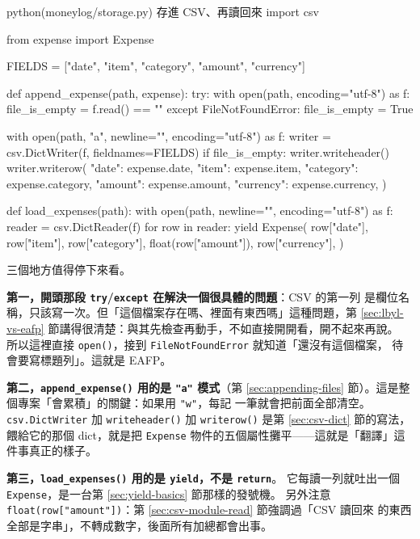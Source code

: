\begin{example}{python}{(moneylog/storage.py) 存進 CSV、再讀回來}
import csv

from expense import Expense

FIELDS = ["date", "item", "category", "amount", "currency"]


def append_expense(path, expense):
    try:
        with open(path, encoding="utf-8") as f:
            file_is_empty = f.read() == ""
    except FileNotFoundError:
        file_is_empty = True

    with open(path, "a", newline="", encoding="utf-8") as f:
        writer = csv.DictWriter(f, fieldnames=FIELDS)
        if file_is_empty:
            writer.writeheader()
        writer.writerow({
            "date": expense.date,
            "item": expense.item,
            "category": expense.category,
            "amount": expense.amount,
            "currency": expense.currency,
        })


def load_expenses(path):
    with open(path, newline="", encoding="utf-8") as f:
        reader = csv.DictReader(f)
        for row in reader:
            yield Expense(
                row["date"],
                row["item"],
                row["category"],
                float(row["amount"]),
                row["currency"],
            )
\end{example}

三個地方值得停下來看。

\textbf{第一，開頭那段 \texttt{try}/\texttt{except} 在解決一個很具體的問題}：CSV 的第一列
是欄位名稱，只該寫一次。但「這個檔案存在嗎、裡面有東西嗎」這種問題，第
\ref{sec:lbyl-vs-eafp} 節講得很清楚：與其先檢查再動手，不如直接開開看，開不起來再說。
所以這裡直接 \texttt{open()}，接到 \texttt{FileNotFoundError} 就知道「還沒有這個檔案，
待會要寫標題列」。這就是 EAFP。

\textbf{第二，\texttt{append\_expense()} 用的是 \texttt{"a"} 模式}（第
\ref{sec:appending-files} 節）。這是整個專案「會累積」的關鍵：如果用 \texttt{"w"}，每記
一筆就會把前面全部清空。\texttt{csv.DictWriter} 加 \texttt{writeheader()} 加
\texttt{writerow()} 是第 \ref{sec:csv-dict} 節的寫法，餵給它的那個 dict，就是把
\texttt{Expense} 物件的五個屬性攤平——這就是「翻譯」這件事真正的樣子。

\textbf{第三，\texttt{load\_expenses()} 用的是 \texttt{yield}，不是 \texttt{return}}。
它每讀一列就吐出一個 \texttt{Expense}，是一台第 \ref{sec:yield-basics} 節那樣的發號機。
另外注意 \texttt{float(row["amount"])}：第 \ref{sec:csv-module-read} 節強調過「CSV 讀回來
的東西全部是字串」，不轉成數字，後面所有加總都會出事。

